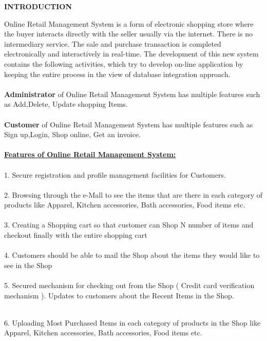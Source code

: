 \documentclass{tcc}
\begin{document}
\begin{center}
\textbf{\Large{INTRODUCTION}}
\end{center}
\vspace{0.1in}
Online Retail Management System is a form of electronic shopping store where the buyer interacts directly with the seller usually via the internet. There is no intermediary service. The sale and purchase transaction is completed electronically and interactively in real-time. The development of this new system contains the following activities, which try to develop on-line application by keeping the entire process in the view of database integration approach.\\
\\
\textbf{Administrator} of Online Retail Management System has multiple features such as Add,Delete, Update shopping Items.\\
\\
\textbf{Customer} of Online Retail Management System has multiple features such as Sign up,Login, Shop online, Get an invoice.\\
\\
\textbf{\underline{Features of Online Retail Management System:}}\\
\\
1.	Secure registration and profile management facilities for Customers. \\
\\
2.	Browsing through the e-Mall to see the items that are there in each category of products like Apparel, Kitchen accessories, Bath accessories, Food items etc.\\ 
\\
3.	Creating a Shopping cart so that customer can Shop N number of items and checkout finally with the entire shopping cart\\
\\
4.	Customers should be able to mail the Shop about the items they would like to see in the Shop\\ 
\\
5.	Secured mechanism for checking out from the Shop ( Credit card verification mechanism ). Updates to customers about the Recent Items in the Shop.\\ 
\\
\newpage
\begin{flushleft}
6.	Uploading Most Purchased Items in each category of products in the Shop like Apparel, Kitchen accessories, Bath accessories, Food items etc.\\
\end{flushleft}
\end{document}
